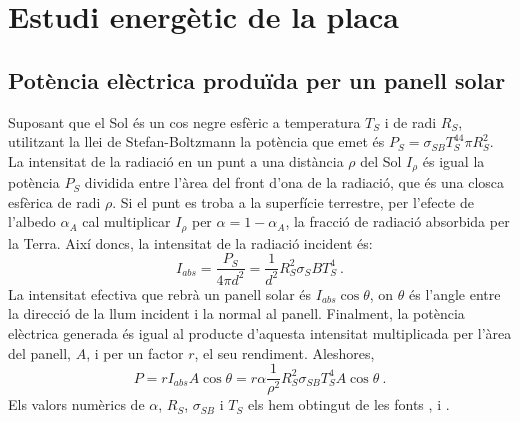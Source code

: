 \documentclass[11pt]{article}
\begin{document}
\section{Estudi energètic de la placa}
\subsection{Potència elèctrica produïda per un panell solar}
Suposant que el Sol és un cos negre esfèric a temperatura $T_S$ i de radi $R_S$, utilitzant la llei de Stefan-Boltzmann la potència que emet és $P_S=\sigma_{SB}T_S^44\pi R_S^2$. La intensitat de la radiació en un punt a una distància ${\rho}$ del Sol $I_{\rho}$ és igual la potència $P_S$ dividida entre l'àrea del front d'ona de la radiació, que és una closca esfèrica de radi ${\rho}$. Si el punt es troba a la superfície terrestre,  per l’efecte de l’albedo $\alpha_A$ cal multiplicar $I_{\rho}$ per $\alpha=1-\alpha_A$, la fracció de radiació absorbida per la Terra. Així doncs, la intensitat de la radiació incident és:
\begin{equation}
    I_{abs} = \frac{P_S}{4\pi d^2}=\frac{1}{d^2}R_S^2\sigma_SB T_S^4 \ .
    \label{I_abs}
\end{equation}
La intensitat efectiva que rebrà un panell solar és $I_{abs} \cos{\theta}$, on $\theta$ és l'angle entre la direcció de la llum incident i la normal al panell. Finalment, la potència elèctrica generada és igual al producte d'aquesta intensitat multiplicada per l'àrea del panell, $A$, i per un factor $r$, el seu rendiment. Aleshores,
\begin{equation}
    P = r I_{abs} A \cos{\theta} = r \alpha \frac{1}{\rho^2}R_S^2\sigma_{SB}T_S^4A \cos{\theta} \ .
    \label{potencia placa}
\end{equation}
Els valors numèrics de $\alpha$, $R_S$, $\sigma_{SB}$ i $T_S$ els hem obtingut de les fonts \cite{Earth Fact Sheet}, \cite{Sun Fact Sheet} i \cite{Universe Glossary}.
\end{document}
